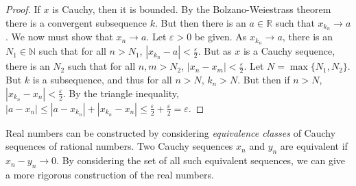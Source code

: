             \begin{proof}
                If $x$ is Cauchy, then it is bounded.
                By the Bolzano-Weiestrass theorem there
                is a convergent subsequence $k$. But then there
                is an $a\in\mathbb{R}$ such that
                $x_{k_{n}}\rightarrow{a}$. We now must show that
                $x_{n}\rightarrow{a}$. Let $\varepsilon>0$
                be given. As $x_{k_{n}}\rightarrow{a}$,
                there is an $N_{1}\in\mathbb{N}$ such
                that for all $n>N_{1}$,
                $|x_{k_{n}}-a|<\frac{\varepsilon}{2}$.
                But as $x$ is a Cauchy sequence, there
                is an $N_{2}$ such that for all $n,m>N_{2}$, 
                $|x_{n}-x_{m}|<\frac{\varepsilon}{2}$. Let
                $N=\max\{N_{1},N_{2}\}$. 
                But $k$ is a subsequence, and thus for all
                $n>N$, $k_{n}>N$. But then if $n>N$,
                $|x_{k_{n}}-x_{n}|<\frac{\varepsilon}{2}$.
                By the triangle inequality,
                    $|a-x_{n}|\leq
                     |a-x_{k_{n}}|+|x_{k_{n}}-x_{n}|\leq
                     \frac{\varepsilon}{2}+
                     \frac{\varepsilon}{2}%
                     =\varepsilon$.
            \end{proof}
            Real numbers can be constructed by considering
            \textit{equivalence classes} of Cauchy sequences of
            rational numbers. Two Cauchy sequences $x_{n}$ and
            $y_{n}$ are equivalent if $x_{n}-y_{n}\rightarrow{0}$.
            By considering the set
            of all such equivalent sequences, we can give a more
            rigorous construction of the real numbers.
